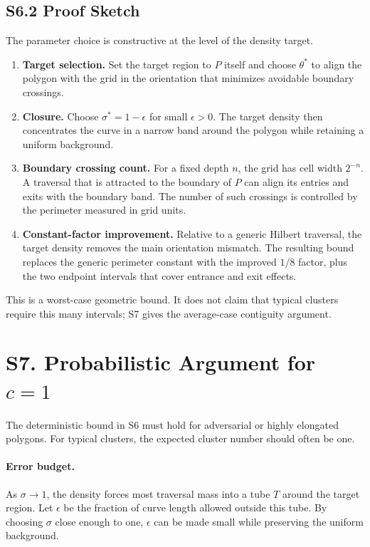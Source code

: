 \documentclass[11pt]{article}
\begin{document}
\subsection*{S6.2 Proof Sketch}
The parameter choice is constructive at the level of the density target.
\begin{enumerate}[leftmargin=1.5em]
    \item \textbf{Target selection.} Set the target region to $P$ itself and choose $\theta^*$ to align the polygon with the grid in the orientation that minimizes avoidable boundary crossings.
    \item \textbf{Closure.} Choose $\sigma^*=1-\epsilon$ for small $\epsilon>0$. The target density then concentrates the curve in a narrow band around the polygon while retaining a uniform background.
    \item \textbf{Boundary crossing count.} For a fixed depth $n$, the grid has cell width $2^{-n}$. A traversal that is attracted to the boundary of $P$ can align its entries and exits with the boundary band. The number of such crossings is controlled by the perimeter measured in grid units.
    \item \textbf{Constant-factor improvement.} Relative to a generic Hilbert traversal, the target density removes the main orientation mismatch. The resulting bound replaces the generic perimeter constant with the improved $1/8$ factor, plus the two endpoint intervals that cover entrance and exit effects.
\end{enumerate}
This is a worst-case geometric bound. It does not claim that typical clusters require this many intervals; S7 gives the average-case contiguity argument.

\section*{S7. Probabilistic Argument for $c=1$}
\label{sec:si-c-one}

The deterministic bound in S6 must hold for adversarial or highly elongated polygons. For typical clusters, the expected cluster number should often be one.

\paragraph{Error budget.}
As $\sigma\to1$, the density forces most traversal mass into a tube $T$ around the target region. Let $\epsilon$ be the fraction of curve length allowed outside this tube. By choosing $\sigma$ close enough to one, $\epsilon$ can be made small while preserving the uniform background.
\end{document}

